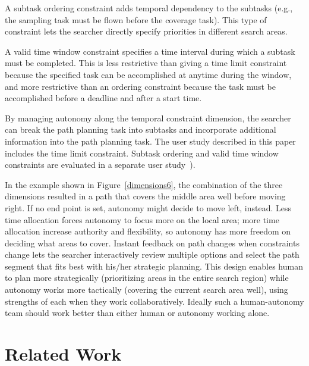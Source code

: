 \documentclass[lettersize, apacite, twoside, HRI]{apa_HRI}
\begin{document}
A subtask ordering constraint adds temporal dependency to the subtasks (e.g., the sampling task must be flown before the coverage task). This type of constraint lets the searcher directly specify priorities in different search areas. 

A valid time window constraint specifies a time interval during which a subtask must be completed.  This is less restrictive than giving a time limit constraint because the specified task can be accomplished at anytime during the window, and more restrictive than an ordering constraint because the task must be accomplished before a deadline and after a start time. 

By managing autonomy along the temporal constraint dimension, the searcher can break the path planning task into subtasks and incorporate additional information into the path planning task. The user study described in this paper includes the time limit constraint. Subtask ordering and valid time window constraints are evaluated in a separate user study~\cite{Clark2013Hierarchical}).

In the example shown in Figure~\ref{dimensions6}, the combination of the three dimensions resulted in a path that covers the middle area well before moving right. If no end point is set, autonomy might decide to move left, instead. Less time allocation forces autonomy to focus more on the local area; more time allocation increase authority and flexibility, so autonomy has more freedom on deciding what areas to cover. Instant feedback on path changes when constraints change lets the searcher interactively review multiple options and select the path segment that fits best with his/her strategic planning. This design enables human to plan more strategically (prioritizing areas in the entire search region) while autonomy works more tactically (covering the current search area well), using strengths of each when they work collaboratively. Ideally such a human-autonomy team should work better than either human or autonomy working alone.

\section{Related Work}
\label{sec:RelatedWork6}
\end{document}
